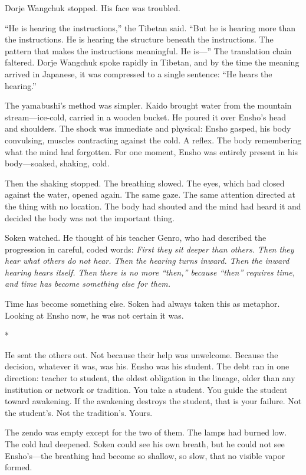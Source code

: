 Dorje Wangchuk stopped. His face was troubled.

``He is hearing the instructions,'' the Tibetan said. ``But he is hearing more than the instructions. He is hearing the structure beneath the instructions. The pattern that makes the instructions meaningful. He is---'' The translation chain faltered. Dorje Wangchuk spoke rapidly in Tibetan, and by the time the meaning arrived in Japanese, it was compressed to a single sentence: ``He hears the hearing.''

The yamabushi's method was simpler. Kaido brought water from the mountain stream---ice-cold, carried in a wooden bucket. He poured it over Ensho's head and shoulders. The shock was immediate and physical: Ensho gasped, his body convulsing, muscles contracting against the cold. A reflex. The body remembering what the mind had forgotten. For one moment, Ensho was entirely present in his body---soaked, shaking, cold.

Then the shaking stopped. The breathing slowed. The eyes, which had closed against the water, opened again. The same gaze. The same attention directed at the thing with no location. The body had shouted and the mind had heard it and decided the body was not the important thing.

Soken watched. He thought of his teacher Genro, who had described the progression in careful, coded words: \emph{First they sit deeper than others. Then they hear what others do not hear. Then the hearing turns inward. Then the inward hearing hears itself. Then there is no more ``then,'' because ``then'' requires time, and time has become something else for them.}

Time has become something else. Soken had always taken this as metaphor. Looking at Ensho now, he was not certain it was.

\begin{center}
*\quad*\quad*
\end{center}

He sent the others out. Not because their help was unwelcome. Because the decision, whatever it was, was his. Ensho was his student. The debt ran in one direction: teacher to student, the oldest obligation in the lineage, older than any institution or network or tradition. You take a student. You guide the student toward awakening. If the awakening destroys the student, that is your failure. Not the student's. Not the tradition's. Yours.

The zendo was empty except for the two of them. The lamps had burned low. The cold had deepened. Soken could see his own breath, but he could not see Ensho's---the breathing had become so shallow, so slow, that no visible vapor formed.

